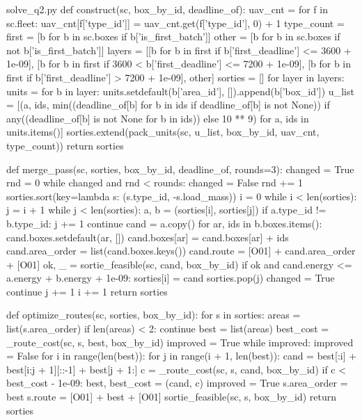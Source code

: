 \documentclass[bwprint]{gmcmthesis}
\begin{document}
\begin{appendices}
\begin{Python}{solve\_q2.py}
def construct(sc, box_by_id, deadline_of):
    uav_cnt = {}
    for f in sc.fleet:
        uav_cnt[f['type_id']] = uav_cnt.get(f['type_id'], 0) + 1
    type_count = {}
    first = [b for b in sc.boxes if b['is_first_batch']]
    other = [b for b in sc.boxes if not b['is_first_batch']]
    layers = [[b for b in first if b['first_deadline'] <= 3600 + 1e-09], [b for b in first if 3600 < b['first_deadline'] <= 7200 + 1e-09], [b for b in first if b['first_deadline'] > 7200 + 1e-09], other]
    sorties = []
    for layer in layers:
        units = {}
        for b in layer:
            units.setdefault(b['area_id'], []).append(b['box_id'])
        u_list = [(a, ids, min((deadline_of[b] for b in ids if deadline_of[b] is not None)) if any((deadline_of[b] is not None for b in ids)) else 10 ** 9) for a, ids in units.items()]
        sorties.extend(pack_units(sc, u_list, box_by_id, uav_cnt, type_count))
    return sorties

def merge_pass(sc, sorties, box_by_id, deadline_of, rounds=3):
    changed = True
    rnd = 0
    while changed and rnd < rounds:
        changed = False
        rnd += 1
        sorties.sort(key=lambda s: (s.type_id, -s.load_mass))
        i = 0
        while i < len(sorties):
            j = i + 1
            while j < len(sorties):
                a, b = (sorties[i], sorties[j])
                if a.type_id != b.type_id:
                    j += 1
                    continue
                cand = a.copy()
                for ar, ids in b.boxes.items():
                    cand.boxes.setdefault(ar, [])
                    cand.boxes[ar] = cand.boxes[ar] + ids
                cand.area_order = list(cand.boxes.keys())
                cand.route = [O01] + cand.area_order + [O01]
                ok, _ = sortie_feasible(sc, cand, box_by_id)
                if ok and cand.energy <= a.energy + b.energy + 1e-09:
                    sorties[i] = cand
                    sorties.pop(j)
                    changed = True
                    continue
                j += 1
            i += 1
    return sorties

def optimize_routes(sc, sorties, box_by_id):
    for s in sorties:
        areas = list(s.area_order)
        if len(areas) < 2:
            continue
        best = list(areas)
        best_cost = _route_cost(sc, s, best, box_by_id)
        improved = True
        while improved:
            improved = False
            for i in range(len(best)):
                for j in range(i + 1, len(best)):
                    cand = best[:i] + best[i:j + 1][::-1] + best[j + 1:]
                    c = _route_cost(sc, s, cand, box_by_id)
                    if c < best_cost - 1e-09:
                        best, best_cost = (cand, c)
                        improved = True
        s.area_order = best
        s.route = [O01] + best + [O01]
        sortie_feasible(sc, s, box_by_id)
    return sorties


\end{Python}
\end{appendices}
\end{document}
